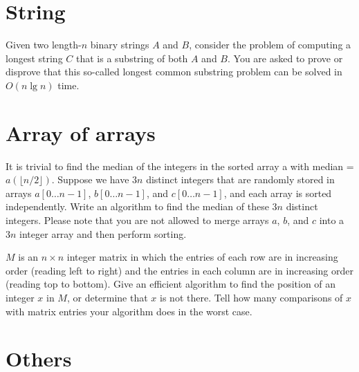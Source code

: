 \begin{refsection}
\section{String}
\begin{Exercise}
Given two length-$n$ binary strings $A$ and $B$, consider the problem of computing a longest string $C$ that is a substring of both $A$ and $B$. You are asked to prove or disprove that this so-called longest common substring problem can be solved in $O(n \lg n)$ time. 
\end{Exercise}
\begin{Answer}
\end{Answer}

\section{Array of arrays}

\begin{Exercise}
It is trivial to find the median of the integers in the sorted array a with median = $a(\lfloor n/2 \rfloor)$. Suppose we have $3n$ distinct integers that are randomly stored in arrays $a[0 \dots n-1]$, $b[0 \dots n-1]$, and $c[0 \dots n-1]$, and each array is sorted independently. Write an algorithm to find the median of these $3n$ distinct integers. Please note that you are not allowed to merge arrays $a$, $b$, and $c$ into a $3n$ integer array and then perform sorting. 
\end{Exercise}
\begin{Answer}
\end{Answer}

\begin{Exercise}
$M$ is an $n \times n$ integer matrix in which the entries of each row are in increasing order (reading left to right) and the entries in each column are in increasing order (reading top to bottom). Give an efficient algorithm to find the position of an integer $x$ in $M$, or determine that $x$ is not there. Tell how many comparisons of $x$ with matrix entries your algorithm does in the worst case. 
\end{Exercise}
\begin{Answer}
\end{Answer}


\section{Others}


\end{refsection}
